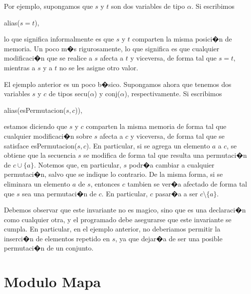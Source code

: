 \documentclass[a4paper,10pt]{article}
\begin{document}
Por ejemplo, supongamos que $s$ y $t$ son dos variables de tipo $\alpha$.  Si escribimos
\begin{center}
  alias($s = t$),
\end{center}
lo que significa informalmente es que $s$ y $t$ comparten la misma posici�n de memoria.  Un poco m�s rigurosamente, lo que significa es que cualquier modificaci�n que se realice a $s$ afecta a $t$ y viceversa, de forma tal que $s = t$, mientras a $s$ y a $t$ no se les asigne otro valor.

El ejemplo anterior es un poco b�sico.  Supongamos ahora que tenemos dos variables $s$ y $c$ de tipos secu($\alpha$) y conj($\alpha$), respectivamente.  Si escribimos
\begin{center}
  alias(esPermutacion($s, c$)),
\end{center}
estamos diciendo que $s$ y $c$ comparten la misma memoria de forma tal que cualquier modificaci�n sobre $s$ afecta a $c$ y viceversa, de forma tal que se satisface esPermutacion($s, c$).  En particular, si se agrega un elemento $a$ a $c$, se obtiene que la secuencia $s$ se modifica de forma tal que resulta una permutaci�n de $c \cup \{a\}$.  Notemos que, en particular, $s$ podr�a cambiar a cualquier permutaci�n, salvo que se indique lo contrario.  De la misma forma, si se eliminara un elemento $a$ de $s$, entonces $c$ tambien se ver�a afectado de forma tal que $s$ sea una permutaci�n de $c$.  En particular, $c$ pasar�a a ser $c \setminus \{a\}$.

Debemos observar que este invariante no es magico, sino que es una declaraci�n como cualquier otra, y el programado debe asegurarse que este invariante se cumpla.  En particular, en el ejemplo anterior, no deberiamos permitir la inserci�n de elementos repetido en $s$, ya que dejar�a de ser una posible permutaci�n de un conjunto.

\section{Modulo Mapa}
\end{document}
